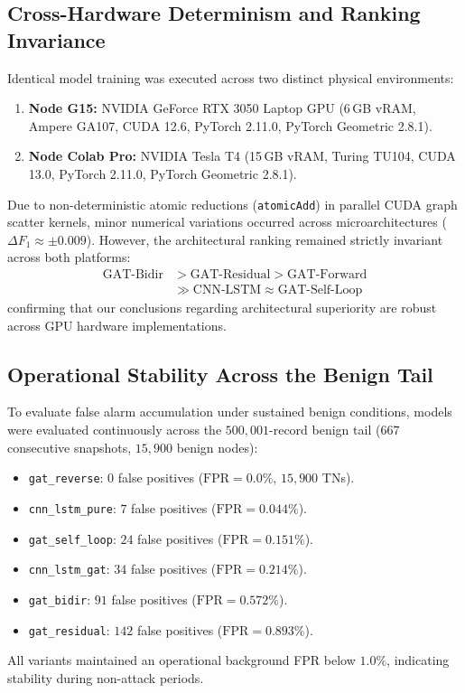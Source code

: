 \documentclass[conference]{IEEEtran}
\begin{document}
\subsection{Cross-Hardware Determinism and Ranking Invariance}
Identical model training was executed across two distinct physical environments:
\begin{enumerate}
    \item \textbf{Node G15:} NVIDIA GeForce RTX 3050 Laptop GPU (6\,GB vRAM, Ampere GA107, CUDA 12.6, PyTorch 2.11.0, PyTorch Geometric 2.8.1).
    \item \textbf{Node Colab Pro:} NVIDIA Tesla T4 (15\,GB vRAM, Turing TU104, CUDA 13.0, PyTorch 2.11.0, PyTorch Geometric 2.8.1).
\end{enumerate}

Due to non-deterministic atomic reductions (\texttt{atomicAdd}) in parallel CUDA graph scatter kernels, minor numerical variations occurred across microarchitectures ($\Delta F_1 \approx \pm 0.009$). However, the architectural ranking remained strictly invariant across both platforms:
\begin{align}
\text{GAT-Bidir} &> \text{GAT-Residual} > \text{GAT-Forward} \nonumber \\
&\gg \text{CNN-LSTM} \approx \text{GAT-Self-Loop}
\end{align}
confirming that our conclusions regarding architectural superiority are robust across GPU hardware implementations.

\subsection{Operational Stability Across the Benign Tail}
To evaluate false alarm accumulation under sustained benign conditions, models were evaluated continuously across the $500{,}001$-record benign tail ($667$ consecutive snapshots, $15{,}900$ benign nodes):
\begin{itemize}
    \item \texttt{gat\_reverse}: $0$ false positives ($\text{FPR} = 0.0\%$, $15{,}900$ TNs).
    \item \texttt{cnn\_lstm\_pure}: $7$ false positives ($\text{FPR} = 0.044\%$).
    \item \texttt{gat\_self\_loop}: $24$ false positives ($\text{FPR} = 0.151\%$).
    \item \texttt{cnn\_lstm\_gat}: $34$ false positives ($\text{FPR} = 0.214\%$).
    \item \texttt{gat\_bidir}: $91$ false positives ($\text{FPR} = 0.572\%$).
    \item \texttt{gat\_residual}: $142$ false positives ($\text{FPR} = 0.893\%$).
\end{itemize}
All variants maintained an operational background FPR below $1.0\%$, indicating stability during non-attack periods.
\end{document}
